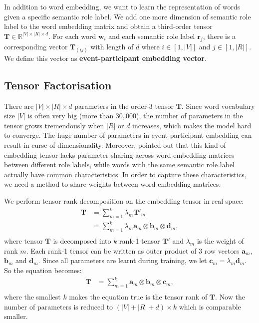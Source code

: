 \documentclass[a4paper]{article}
\begin{document}
In addition to word embedding, we want to learn the representation of words given a specific semantic role label. We add one more dimension of semantic role label to the word embedding matrix and obtain a third-order tensor $\mathbf{T} \in \mathbb{R}^{|V| \times |R| \times d}$. For each word $\mathbf{w}_i$ and each semantic role label $\mathbf{r}_j$, there is a corresponding vector $\mathbf{T}_{(ij)}$ with length of $d$ where $i \in [1, |V|]$ and $j \in [1, |R|]$. We define this vector as \textbf{event-participant embedding vector}. 


\subsection{Tensor Factorisation} \label{sec:tf}
There are $|V| \times |R| \times d$ parameters in the order-3 tensor $\mathbf{T}$. Since word vocabulary size $|V|$ is often very big (more than $30,000$), the number of parameters in the tensor grows tremendously when $|R|$ or $d$ increases, which makes the model hard to converge. The huge number of parameters in event-participant embedding can result in curse of dimensionality. Moreover, \citep{tilk2016event} pointed out that this kind of embedding tensor lacks parameter sharing across word embedding matrices between different role labels, while words with the same semantic role label actually have common characteristics. In order to capture these characteristics, we need a method to share weights between word embedding matrices. 

We perform tensor rank decomposition \citep{hitchcock1927expression} on the embedding tensor in real space:
\begin{equation} \label{eq:trd-org}
\begin{aligned}
    \mathbf{T}   
        &= \sum_{m=1}^{k} \lambda_m \mathbf{T}'_m \\
        &= \sum_{m=1}^{k} \lambda_m \mathbf{a}_m \otimes \mathbf{b}_m \otimes \mathbf{d}_m, \\
\end{aligned}
\end{equation}
where tensor $\mathbf{T}$ is decomposed into $k$ rank-1 tensor $\mathbf{T}'$ and $\lambda_m$ is the weight of rank $m$. Each rank-1 tensor can be written as outer product of 3 row vectors $\mathbf{a}_m$, $\mathbf{b}_m$ and $\mathbf{d}_m$. Since all parameters are learnt during training, we let $\mathbf{c}_m = \lambda_m \mathbf{d}_m$. So the equation becomes:
\begin{equation} \label{eq:trd}
\begin{aligned}
    \mathbf{T}   
        &= \sum_{m=1}^{k} \mathbf{a}_m \otimes \mathbf{b}_m \otimes \mathbf{c}_m, \\
\end{aligned}
\end{equation}
where the smallest $k$ makes the equation true is the tensor rank of $\mathbf{T}$. Now the number of parameters is reduced to $(|V| + |R| + d) \times k$ which is comparable smaller. 
\end{document}
